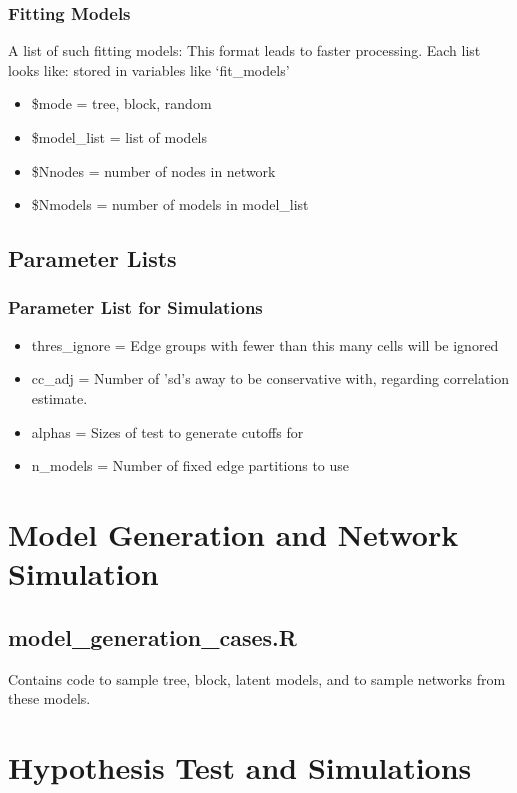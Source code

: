 \documentclass[11pt]{article}
\begin{document}
\subsubsection{Fitting Models}
A list of such fitting models: This format leads to faster processing. Each list looks like: stored in variables like `fit\_models'
\begin{itemize}


\item \$mode = tree, block, random
\item \$model\_list = list of models
\item \$Nnodes  = number of nodes in network
\item \$Nmodels = number of models in model\_list
\end{itemize}

\subsection{Parameter Lists}
\subsubsection{Parameter List for Simulations}
\begin{itemize}
\item thres\_ignore = Edge groups with fewer than this many cells will be ignored
\item cc\_adj = Number of 'sd's away to be conservative with, regarding correlation estimate. 
\item alphas = Sizes of test to generate cutoffs for
\item n\_models = Number of fixed edge partitions to use

\end{itemize}


\section{Model Generation and Network Simulation}

\subsection{model\_generation\_cases.R}
Contains code to sample tree, block, latent models, and to sample networks from these models. 

\section{Hypothesis Test and Simulations}
\end{document}
